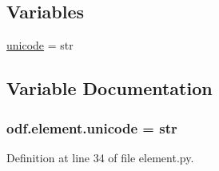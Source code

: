 \subsection*{Variables}
\begin{DoxyCompactItemize}
\item 
\hyperlink{namespaceodf_1_1element_a9474456bb442e238b32a7bdf6a22dcba}{unicode} = str
\end{DoxyCompactItemize}


\subsection{Variable Documentation}
\hypertarget{namespaceodf_1_1element_a9474456bb442e238b32a7bdf6a22dcba}{
\subsubsection[{unicode}]{\setlength{\rightskip}{0pt plus 5cm}odf.\+element.\+unicode = str}}\label{namespaceodf_1_1element_a9474456bb442e238b32a7bdf6a22dcba}


Definition at line 34 of file element.\+py.


